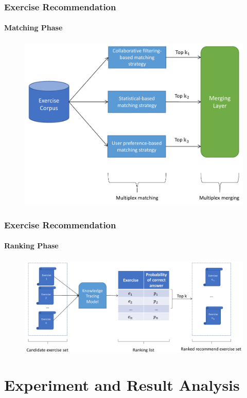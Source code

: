 \documentclass[10pt,aspectratio=43,mathserif]{beamer}
\begin{document}
\begin{frame}
	\frametitle{Exercise Recommendation}
	\framesubtitle{Matching Phase}
	\begin{figure}
		\centering
		\includegraphics[height=0.7\textheight]{figures/ch4-matching-model.pdf}
	\end{figure}
\end{frame}

\begin{frame}
	\frametitle{Exercise Recommendation}
	\framesubtitle{Ranking Phase}
	\begin{figure}
		\centering
		\includegraphics[width=1.0\textwidth]{figures/ch4-ranking-model.pdf}
	\end{figure}
\end{frame}

\section{Experiment and Result Analysis}
\end{document}

